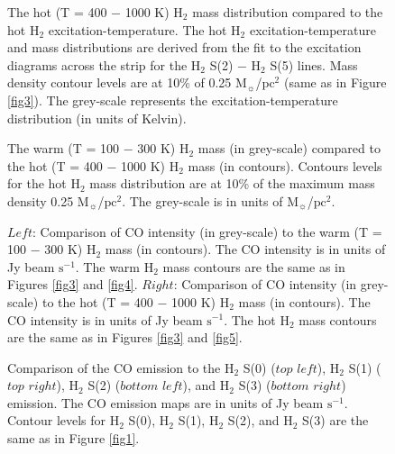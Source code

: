 \documentclass[manuscript]{aastex}
\begin{document}
\clearpage
\begin{figure}
\caption{The hot (T = 400 $-$ 1000 K) $\mathrm{H_2}$ mass distribution compared 
to the hot $\mathrm{H_2}$ excitation-temperature.  The hot $\mathrm{H_2}$ excitation-temperature 
and mass distributions are derived from the fit to the excitation diagrams across the 
strip for the $\mathrm{H_2}$ S(2) $-$ $\mathrm{H_2}$ S(5) lines.  Mass density 
contour levels are at 10\% of 0.25 $\mathrm{M_\sun}$/$\mathrm{pc^2}$ (same as in Figure \ref{fig3}). 
The grey-scale represents the excitation-temperature distribution (in units of Kelvin).}
\end{figure}

\clearpage

\begin{figure}
\caption{The warm (T = 100 $-$ 300 K) $\mathrm{H_2}$ mass (in grey-scale) compared to
 the hot (T = 400 $-$ 1000 K) $\mathrm{H_2}$ mass (in contours).  Contours levels for the 
 hot $\mathrm{H_2}$ mass distribution are at 10\% of the maximum mass density 
 0.25 $\mathrm{M_\sun}$/$\mathrm{pc^2}$.  The grey-scale is in units of 
 $\mathrm{M_\sun}$/$\mathrm{pc^2}$.}
\end{figure}

\clearpage

\begin{figure}
\caption{$Left$: Comparison of  CO intensity (in grey-scale) to the warm (T = 100 $-$ 300 K) 
$\mathrm{H_2}$ mass (in contours).  The CO intensity is in units of Jy beam $\mathrm{s^{-1}}$. 
The warm $\mathrm{H_2}$ mass contours are the same as in Figures \ref{fig3} and \ref{fig4}.  
$Right$: Comparison of CO intensity (in grey-scale) to the hot (T = 400 $-$ 1000 K) 
$\mathrm{H_2}$ mass (in contours).  The CO intensity is in units of Jy beam 
$\mathrm{s^{-1}}$. The hot $\mathrm{H_2}$ mass contours are the same as in 
Figures \ref{fig3} and \ref{fig5}.}
\end{figure}

\clearpage

\begin{figure}
\caption{Comparison of the CO emission to the $\mathrm{H_2}$ S(0) ($top$ $left$), 
 $\mathrm{H_2}$ S(1) ($top$ $right$),  $\mathrm{H_2}$ S(2) ($bottom$ $left$),  and 
 $\mathrm{H_2}$ S(3) ($bottom$ $right$) emission.  The CO emission maps are in 
 units of Jy beam $\mathrm{s^{-1}}$.  Contour levels for $\mathrm{H_2}$ S(0), 
 $\mathrm{H_2}$ S(1), $\mathrm{H_2}$ S(2), and $\mathrm{H_2}$ S(3) are the 
 same as in Figure \ref{fig1}.}
\end{figure}
\end{document}
